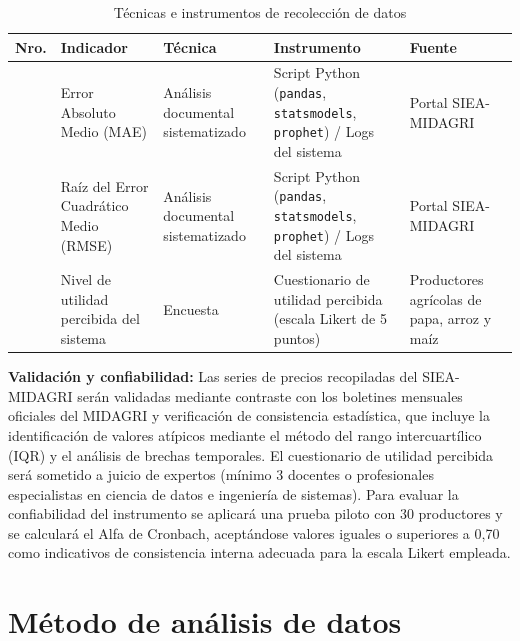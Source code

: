 \documentclass[12pt, a4paper]{report}
\begin{document}
\begin{table}[h!]
\centering
\caption{Técnicas e instrumentos de recolección de datos}
\label{tab:tecnicas_instrumentos}
\singlespacing
\small
\begin{tabular}{|>{\centering\arraybackslash}p{0.8cm}
                |>{\raggedright\arraybackslash}p{3cm}
                |>{\raggedright\arraybackslash}p{2.8cm}
                |>{\raggedright\arraybackslash}p{3.2cm}
                |>{\raggedright\arraybackslash}p{3cm}|}
\hline
\textbf{Nro.} & \textbf{Indicador} & \textbf{Técnica} & \textbf{Instrumento} & \textbf{Fuente} \\
\hline
1 & Error Absoluto Medio (MAE) &
  Análisis documental sistematizado &
  Script Python (\texttt{pandas}, \texttt{statsmodels}, \texttt{prophet}) / Logs del sistema &
  Portal SIEA-MIDAGRI \\
\hline
2 & Raíz del Error Cuadrático Medio (RMSE) &
  Análisis documental sistematizado &
  Script Python (\texttt{pandas}, \texttt{statsmodels}, \texttt{prophet}) / Logs del sistema &
  Portal SIEA-MIDAGRI \\
\hline
3 & Nivel de utilidad percibida del sistema &
  Encuesta &
  Cuestionario de utilidad percibida (escala Likert de 5 puntos) &
  Productores agrícolas de papa, arroz y maíz \\
\hline
\end{tabular}
\end{table}

\vspace{0.3cm}

\textbf{Validación y confiabilidad:} Las series de precios recopiladas del SIEA-MIDAGRI serán validadas mediante contraste con los boletines mensuales oficiales del MIDAGRI y verificación de consistencia estadística, que incluye la identificación de valores atípicos mediante el método del rango intercuartílico (IQR) y el análisis de brechas temporales. El cuestionario de utilidad percibida será sometido a juicio de expertos (mínimo 3 docentes o profesionales especialistas en ciencia de datos e ingeniería de sistemas). Para evaluar la confiabilidad del instrumento se aplicará una prueba piloto con 30 productores y se calculará el Alfa de Cronbach, aceptándose valores iguales o superiores a 0{,}70 como indicativos de consistencia interna adecuada para la escala Likert empleada.

\section*{Método de análisis de datos}
\end{document}
